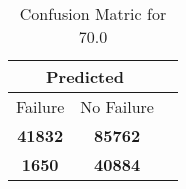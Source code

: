 \begin{table}[] 
\caption{Confusion Matric for 70.0} 
\label{Table: Prediction Accuracy-DMD70.0OnlySunEKF-resetReflectionEKF-top2-Reflection} 
\centering 
\begin{tabular} 
 {@{}ccc@{}} 
\toprule 
\multicolumn{2}{c}{\textbf{Predicted}}
 \\ \midrule 
\multicolumn{1}{|c|}{Failure} & 
\multicolumn{1}{c|}{No Failure}
 \\ \midrule 
\multicolumn{1}{|c|}{\color{green}\textbf{41832}} & 
\multicolumn{1}{c|}{\color{green}\textbf{85762}}
 \\ \midrule 
\multicolumn{1}{|c|}{\color{red}\textbf{1650}} & 
\multicolumn{1}{c|}{\color{red}\textbf{40884}}
 \\ \bottomrule 
\end{tabular} 
\end{table} 
